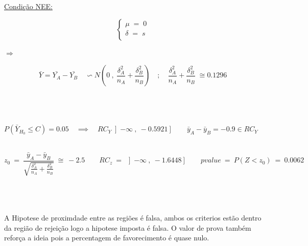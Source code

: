 \\
\\
\hspace*{5cm} \underline{Condição NEE:}\\
\begin{minipage}[l]{0pt}
$$\left\lbrace\begin{array}{c}
\mu \;=\; 0 \\
\delta \;=\; s \\
\end{array}\right.$$
\end{minipage}
\hspace{3cm} $\Longrightarrow$ \hspace{1cm}
\begin{minipage}[l]{0pt}
\[ \bar{Y}=\bar{Y_A}-\bar{Y_B} \quad \backsim N \left( 0\:,\: \frac{\delta_A^2}{n_A}+\frac{\delta_B^2}{n_B} \right) \quad ; \quad \frac{\delta_A^2}{n_A}+\frac{\delta_B^2}{n_B} \; \cong 0.1296 \]
\end{minipage}\\
\\
\\
$P(\bar{Y}_{H_0} \leqslant C)=0.05 \quad \implies \quad RC_Y\left] -\infty \:,\: -0.5921 \right] \qquad \bar{y}_A-\bar{y}_B=-0.9 \in RC_Y $ \\
\\
\begin{minipage}[l]{0pt}
\[  z_0\:=\: \frac{\bar{y}_A-\bar{y}_B}{\sqrt{\frac{\delta_A^2}{n_A}+\frac{\delta_B^2}{n_B}}}\:\cong\: -2.5 \qquad
	RC_z \:=\: \left] -\infty \:,\: -1.6448 \right]  \qquad
	pvalue \:=\: P(Z<z_0) \:=\: 0.0062 \]
\end{minipage}\\
\\
\\
A Hipotese de proximdade entre as regiões é falsa, ambos os criterios estão dentro da região de rejeição logo a hipotese imposta é falsa.
O valor de prova também reforça a ideia pois a percentagem de favorecimento é quase nulo.
\newpage
